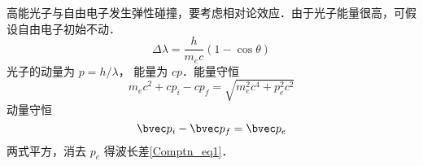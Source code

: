 

高能光子与自由电子发生弹性碰撞，要考虑相对论效应．由于光子能量很高，可假设自由电子初始不动．
\begin{equation}\label{Comptn_eq1}
\Delta \lambda  = \frac{h}{m_e c}(1 - \cos\theta )
\end{equation}
光子的动量为 $p = h/\lambda$， 能量为 $cp$．能量守恒
\begin{equation}
m_e c^2 + c p_i - c p_f = \sqrt{m_e^2 c^4 + p_e^2 c^2}
\end{equation}
动量守恒
\begin{equation}
\bvec p_i - \bvec p_f = \bvec p_e
\end{equation}
两式平方，消去 $p_e$ 得波长差\autoref{Comptn_eq1}．
